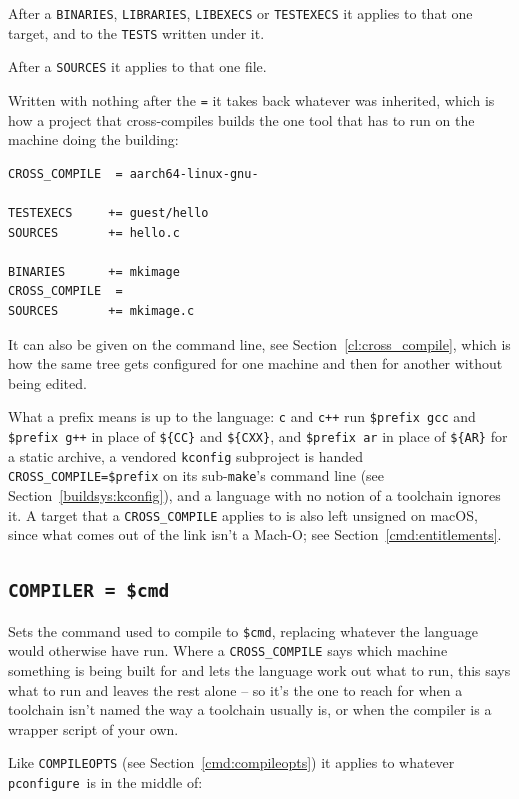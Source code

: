 \documentclass{article}
\newcommand{\pconfigure}{\texttt{pconfigure}}
\begin{document}
After a \texttt{BINARIES}, \texttt{LIBRARIES}, \texttt{LIBEXECS} or
\texttt{TESTEXECS} it applies to that one target, and to the
\texttt{TESTS} written under it.

After a \texttt{SOURCES} it applies to that one file.

Written with nothing after the \texttt{=} it takes back whatever was
inherited, which is how a project that cross-compiles builds the one
tool that has to run on the machine doing the building:

\begin{verbatim}
CROSS_COMPILE  = aarch64-linux-gnu-

TESTEXECS     += guest/hello
SOURCES       += hello.c

BINARIES      += mkimage
CROSS_COMPILE  =
SOURCES       += mkimage.c
\end{verbatim}

It can also be given on the command line, see
Section~\ref{cl:cross_compile}, which is how the same tree gets
configured for one machine and then for another without being edited.

What a prefix means is up to the language: \texttt{c} and \texttt{c++}
run \texttt{\$prefix gcc} and \texttt{\$prefix g++} in place of
\texttt{\$\{CC\}} and \texttt{\$\{CXX\}}, and \texttt{\$prefix ar} in
place of \texttt{\$\{AR\}} for a static archive, a vendored \texttt{kconfig}
subproject is handed \texttt{CROSS\_COMPILE=\$prefix} on its
sub-\texttt{make}'s command line (see Section~\ref{buildsys:kconfig}),
and a language with no notion of a toolchain ignores it.  A target
that a \texttt{CROSS\_COMPILE} applies to is also left unsigned on
macOS, since what comes out of the link isn't a Mach-O; see
Section~\ref{cmd:entitlements}.

\subsection{\texttt{COMPILER = \$cmd} \label{cmd:compiler}}

Sets the command used to compile to \texttt{\$cmd}, replacing whatever
the language would otherwise have run.  Where a
\texttt{CROSS\_COMPILE} says which machine something is being built
for and lets the language work out what to run, this says what to run
and leaves the rest alone -- so it's the one to reach for when a
toolchain isn't named the way a toolchain usually is, or when the
compiler is a wrapper script of your own.

Like \texttt{COMPILEOPTS} (see Section~\ref{cmd:compileopts}) it
applies to whatever \pconfigure\ is in the middle of:
\end{document}
